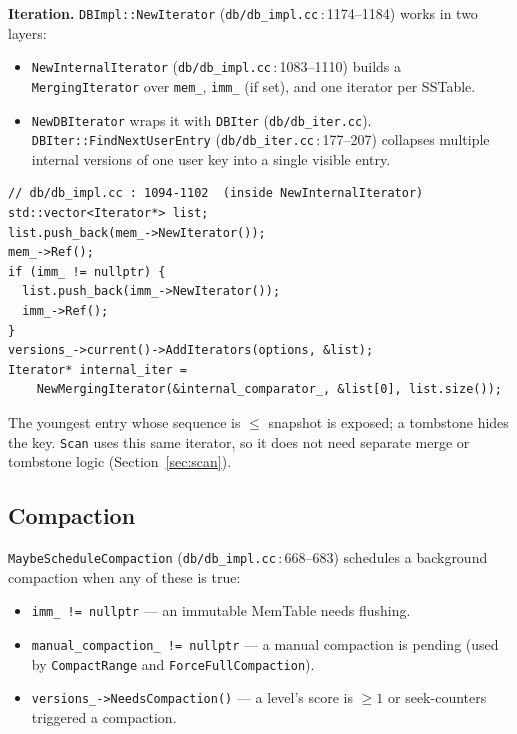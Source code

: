 \documentclass[11pt,a4paper]{article}
\newcommand{\codref}[2]{\textcolor{accent}{\texttt{\small#1}}\,$\!:\!$\textcolor{primary!70!black}{\small#2}}
\newcommand{\fname}[1]{\textcolor{primary!85!black}{\texttt{#1}}}
\newcommand{\sym}[1]{\texttt{#1}}
\begin{document}
\textbf{Iteration.} \sym{DBImpl::NewIterator}
(\codref{db/db\_impl.cc}{1174--1184}) works in two layers:
\begin{itemize}[leftmargin=1.4em,itemsep=2pt]
    \item \sym{NewInternalIterator} (\codref{db/db\_impl.cc}{1083--1110})
          builds a \sym{MergingIterator} over \sym{mem\_}, \sym{imm\_} (if
          set), and one iterator per SSTable.
    \item \sym{NewDBIterator} wraps it with \sym{DBIter}
          (\fname{db/db\_iter.cc}). \sym{DBIter::FindNextUserEntry}
          (\codref{db/db\_iter.cc}{177--207}) collapses multiple internal
          versions of one user key into a single visible entry.
\end{itemize}

\begin{lstlisting}
// db/db_impl.cc : 1094-1102  (inside NewInternalIterator)
std::vector<Iterator*> list;
list.push_back(mem_->NewIterator());
mem_->Ref();
if (imm_ != nullptr) {
  list.push_back(imm_->NewIterator());
  imm_->Ref();
}
versions_->current()->AddIterators(options, &list);
Iterator* internal_iter =
    NewMergingIterator(&internal_comparator_, &list[0], list.size());
\end{lstlisting}

The youngest entry whose sequence is $\le$ snapshot is exposed; a tombstone
hides the key. \sym{Scan} uses this same iterator, so it does not need
separate merge or tombstone logic (Section~\ref{sec:scan}).

\subsection{Compaction}

\sym{MaybeScheduleCompaction} (\codref{db/db\_impl.cc}{668--683}) schedules
a background compaction when any of these is true:
\begin{itemize}[leftmargin=1.4em,itemsep=1pt]
    \item \sym{imm\_ != nullptr} --- an immutable MemTable needs flushing.
    \item \sym{manual\_compaction\_ != nullptr} --- a manual compaction
          is pending (used by \sym{CompactRange} and \sym{ForceFullCompaction}).
    \item \sym{versions\_->NeedsCompaction()} --- a level's score is $\ge 1$
          or seek-counters triggered a compaction.
\end{itemize}
\end{document}
